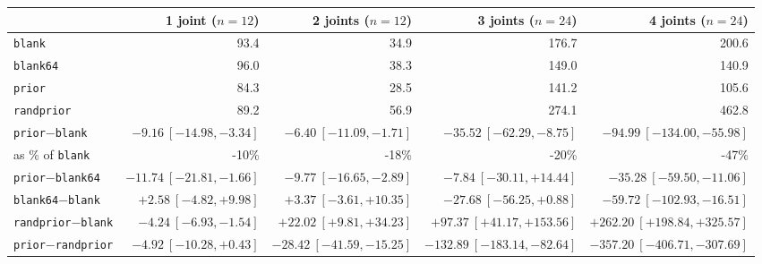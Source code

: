 \begin{tabular}{@{}lrrrr@{}}
\toprule
 & 1 joint ($n{=}12$) & 2 joints ($n{=}12$) & 3 joints ($n{=}24$) & 4 joints ($n{=}24$) \\
\midrule
\texttt{blank} & 93.4 & 34.9 & 176.7 & 200.6 \\
\texttt{blank64} & 96.0 & 38.3 & 149.0 & 140.9 \\
\texttt{prior} & 84.3 & 28.5 & 141.2 & 105.6 \\
\texttt{randprior} & 89.2 & 56.9 & 274.1 & 462.8 \\
\midrule
\texttt{prior}$-$\texttt{blank} & $\mathbf{-9.16}\ [-14.98, -3.34]$ & $\mathbf{-6.40}\ [-11.09, -1.71]$ & $\mathbf{-35.52}\ [-62.29, -8.75]$ & $\mathbf{-94.99}\ [-134.00, -55.98]$ \\
\quad as \% of \texttt{blank} & -10\% & -18\% & -20\% & -47\% \\
\texttt{prior}$-$\texttt{blank64} & $\mathbf{-11.74}\ [-21.81, -1.66]$ & $\mathbf{-9.77}\ [-16.65, -2.89]$ & $-7.84\ [-30.11, +14.44]$ & $\mathbf{-35.28}\ [-59.50, -11.06]$ \\
\texttt{blank64}$-$\texttt{blank} & $+2.58\ [-4.82, +9.98]$ & $+3.37\ [-3.61, +10.35]$ & $-27.68\ [-56.25, +0.88]$ & $\mathbf{-59.72}\ [-102.93, -16.51]$ \\
\texttt{randprior}$-$\texttt{blank} & $\mathbf{-4.24}\ [-6.93, -1.54]$ & $\mathbf{+22.02}\ [+9.81, +34.23]$ & $\mathbf{+97.37}\ [+41.17, +153.56]$ & $\mathbf{+262.20}\ [+198.84, +325.57]$ \\
\texttt{prior}$-$\texttt{randprior} & $-4.92\ [-10.28, +0.43]$ & $\mathbf{-28.42}\ [-41.59, -15.25]$ & $\mathbf{-132.89}\ [-183.14, -82.64]$ & $\mathbf{-357.20}\ [-406.71, -307.69]$ \\
\bottomrule
\end{tabular}
